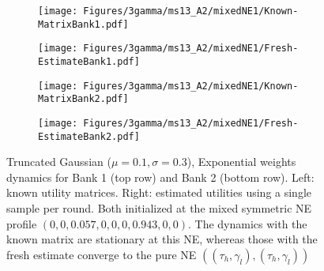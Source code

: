 \begin{figure}[H]
    \centering
    \begin{subfigure}{0.49\linewidth}
        \centering
        \texttt{[image: Figures/3gamma/ms13\_A2/mixedNE1/Known-MatrixBank1.pdf]}
    \end{subfigure}
    \begin{subfigure}{0.49\linewidth}
        \centering
        \texttt{[image: Figures/3gamma/ms13\_A2/mixedNE1/Fresh-EstimateBank1.pdf]}
    \end{subfigure}

    \begin{subfigure}{0.49\linewidth}
        \centering
        \texttt{[image: Figures/3gamma/ms13\_A2/mixedNE1/Known-MatrixBank2.pdf]}
    \end{subfigure}
    \begin{subfigure}{0.49\linewidth}
        \centering
        \texttt{[image: Figures/3gamma/ms13\_A2/mixedNE1/Fresh-EstimateBank2.pdf]}
    \end{subfigure}
    \caption{Truncated Gaussian ($\mu=0.1, \sigma=0.3$), Exponential weights dynamics for Bank 1 (top row) and Bank 2 (bottom row). Left: known utility matrices. Right: estimated utilities using a single sample per round. Both initialized at the mixed symmetric NE profile $(0, 0, 0.057, 0, 0, 0, 0.943, 0, 0)$. The dynamics with the known matrix are stationary at this NE, whereas those with the fresh estimate converge to the pure NE $((\tau_h, \gamma_l),(\tau_h, \gamma_l))$ \label{fig:dyna-A2-mixed1}}

\end{figure}


